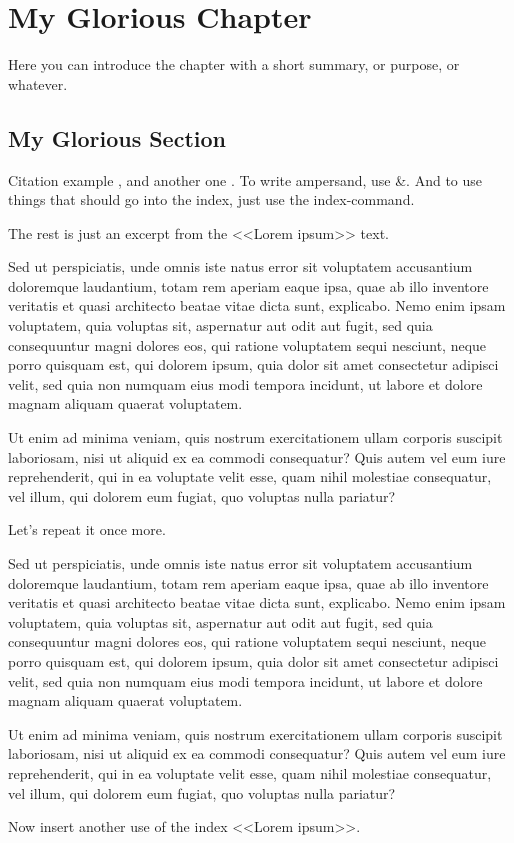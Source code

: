 \chapter{My Glorious Chapter}

Here you can introduce the chapter with a short summary, or purpose, or
whatever.

\section{My Glorious Section}

Citation example \cite[p.~42]{TagToUseInLatexDocs}, and another one
\cite{RealDonaldKnuth}. To write ampersand, use
\&{}. And to use things that should go into the index, just use
the index-command.

The rest is just an excerpt from the <<Lorem ipsum>> text.

Sed ut perspiciatis, unde omnis iste natus error sit voluptatem accusantium
doloremque laudantium, totam rem aperiam eaque ipsa, quae ab illo inventore
veritatis et quasi architecto beatae vitae dicta sunt, explicabo. Nemo enim
ipsam voluptatem, quia voluptas sit, aspernatur aut odit aut fugit, sed quia
consequuntur magni dolores eos, qui ratione voluptatem sequi nesciunt, neque
porro quisquam est, qui dolorem ipsum, quia dolor sit amet consectetur adipisci
velit, sed quia non numquam eius modi tempora incidunt, ut labore et dolore
magnam aliquam quaerat voluptatem.

Ut enim ad minima veniam, quis nostrum exercitationem ullam corporis suscipit
laboriosam, nisi ut aliquid ex ea commodi consequatur? Quis autem vel eum iure
reprehenderit, qui in ea voluptate velit esse, quam nihil molestiae
consequatur, vel illum, qui dolorem eum fugiat, quo voluptas nulla pariatur?

Let's repeat it once more.

Sed ut perspiciatis, unde omnis iste natus error sit voluptatem accusantium
doloremque laudantium, totam rem aperiam eaque ipsa, quae ab illo inventore
veritatis et quasi architecto beatae vitae dicta sunt, explicabo. Nemo enim
ipsam voluptatem, quia voluptas sit, aspernatur aut odit aut fugit, sed quia
consequuntur magni dolores eos, qui ratione voluptatem sequi nesciunt, neque
porro quisquam est, qui dolorem ipsum, quia dolor sit amet consectetur adipisci
velit, sed quia non numquam eius modi tempora incidunt, ut labore et dolore
magnam aliquam quaerat voluptatem.

Ut enim ad minima veniam, quis nostrum exercitationem ullam corporis suscipit
laboriosam, nisi ut aliquid ex ea commodi consequatur? Quis autem vel eum iure
reprehenderit, qui in ea voluptate velit esse, quam nihil molestiae
consequatur, vel illum, qui dolorem eum fugiat, quo voluptas nulla pariatur?

Now insert another use of the index <<Lorem ipsum>>.
